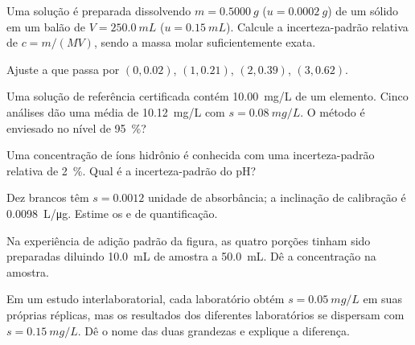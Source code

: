 \begin{exercise}[$\star$]\label{exo:b2:measurement-statistics:3}
Uma solução é preparada dissolvendo $m = \qty{0.5000}{g}$ ($u = \qty{0.0002}{g}$) de um sólido em um balão
de $V = \qty{250.0}{mL}$ ($u = \qty{0.15}{mL}$). Calcule a incerteza-padrão relativa de $c = m/(MV)$,
sendo a massa molar suficientemente exata.
\end{exercise}

\begin{exercise}[$\star$]\label{exo:b2:measurement-statistics:4}
Ajuste a  que passa por $(0, 0.02)$, $(1, 0.21)$, $(2, 0.39)$, $(3, 0.62)$.
\end{exercise}

\begin{exercise}[$\star\star$]\label{exo:b2:measurement-statistics:5}
Uma solução de referência certificada contém \qty{10.00}{mg/L} de um elemento. Cinco análises dão uma
média de \qty{10.12}{mg/L} com $s = \qty{0.08}{mg/L}$. O método é enviesado no nível de 95~\%?
\end{exercise}

\begin{exercise}[$\star\star$]\label{exo:b2:measurement-statistics:6}
Uma concentração de íons hidrônio é conhecida com uma incerteza-padrão relativa de 2~\%. Qual é a
incerteza-padrão do pH?
\end{exercise}

\begin{exercise}[$\star\star$]\label{exo:b2:measurement-statistics:7}
Dez brancos têm $s = 0.0012$ unidade de absorbância; a inclinação de calibração é \qty{0.0098}{L/\micro g}.
Estime os  e de quantificação.
\end{exercise}

\begin{exercise}[$\star\star$]\label{exo:b2:measurement-statistics:8}
Na experiência de adição padrão da figura, as quatro porções tinham sido preparadas diluindo
\qty{10.0}{mL} de amostra a \qty{50.0}{mL}. Dê a concentração na amostra.
\end{exercise}

\begin{exercise}[$\star\star$]\label{exo:b2:measurement-statistics:9}
Em um estudo interlaboratorial, cada laboratório obtém $s = \qty{0.05}{mg/L}$ em suas próprias réplicas,
mas os resultados dos diferentes laboratórios se dispersam com $s = \qty{0.15}{mg/L}$. Dê o nome das duas
grandezas e explique a diferença.
\end{exercise}

